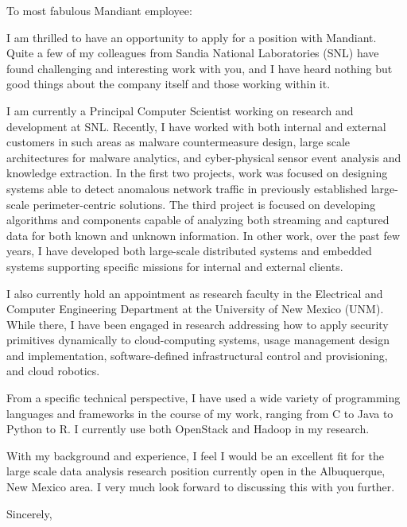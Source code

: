 \documentclass[10pt,letterpaper]{letter}
\begin{document}
 
\begin{letter}{
} 
\opening{To most fabulous Mandiant employee:} 
 
I am thrilled to have an opportunity to apply for a position with Mandiant.  Quite a few of my colleagues from Sandia National Laboratories (SNL) have found challenging and interesting work with you, and I have heard nothing but good things about the company itself and those working within it.

I am currently a Principal Computer Scientist working on research and development at SNL.  Recently, I have worked with both internal and external customers in such areas as malware countermeasure design, large scale architectures for malware analytics, and cyber-physical sensor event analysis and knowledge extraction. In the first two projects, work was focused on designing systems able to detect anomalous network traffic in previously established large-scale perimeter-centric solutions.  The third project is focused on developing algorithms and components capable of analyzing both streaming and captured data for both known and unknown information.  In other work, over the past few years, I have developed both large-scale distributed systems and embedded systems supporting specific missions for internal and external clients.

I also currently hold an appointment as research faculty in the Electrical and Computer Engineering Department at the University of New Mexico (UNM).  While there, I have been engaged in research addressing how to apply security primitives dynamically to cloud-computing systems, usage management design and implementation, software-defined infrastructural control and provisioning, and cloud robotics.

From a specific technical perspective, I have used a wide variety of programming languages and frameworks in the course of my work, ranging from C to Java to Python to R. I currently use both OpenStack and Hadoop in my research. 

With my background and experience, I feel I would be an excellent fit for the large scale data analysis research position currently open in the Albuquerque, New Mexico area.  I very much look forward to discussing this with you further.
 
\closing{Sincerely,} 
\end{letter} 
\end{document}
